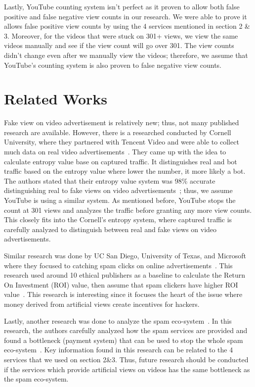\documentclass[conference]{IEEEtran}
\begin{document}
Lastly, YouTube counting system isn’t perfect as it proven to allow both false positive and false negative view counts in our research. We were able to prove it allows false positive view counts by using the 4 services mentioned in section 2 \& 3. Moreover, for the videos that were stuck on 301+ views, we view the same videos manually and see if the view count will go over 301. The view counts didn’t change even after we manually view the videos; therefore, we assume that YouTube’s counting
system is also proven to false negative view counts.

\section{Related Works}

Fake view on video advertisement is relatively new; thus, not many published research are available. However, there is a researched conducted by Cornell University, where they partnered with Tencent Video and were able to collect much data on real video advertisements~\cite{c5}. They came up with the idea to calculate entropy value base on captured traffic. It distinguishes real and bot traffic based on the entropy value where lower the number, it more likely a bot. The authors stated that
their entropy value system was 98\% accurate distinguishing real to fake views on video advertisements~\cite{c5}; thus, we assume YouTube is using a similar system. As mentioned before, YouTube stops the count at 301 views and analyzes the traffic before granting any more view counts. This closely fits into the Cornell’s entropy system, where captured traffic is carefully analyzed to distinguish between real and fake views on video advertisements.

Similar research was done by UC San Diego, University of Texas, and Microsoft where they focused to catching spam clicks on online advertisements~\cite{c18}. This research used around 10 ethical publishers as a baseline to calculate the Return On Investment (ROI) value, then assume that spam clickers have higher ROI value~\cite{c18}. This research is interesting since it focuses the heart of the issue where money derived from artificial views create incentives for hackers.

Lastly, another research was done to analyze the spam eco-system~\cite{c18}. In this research, the authors carefully analyzed how the spam services are provided and found a bottleneck (payment system) that can be used to stop the whole spam eco-system~\cite{c18}. Key information found in this research can be related to the 4 services that we used on section 2\&3. Thus, future research should be conducted if the services which provide artificial views on videos has the same bottleneck as the
spam eco-system.
\end{document}
